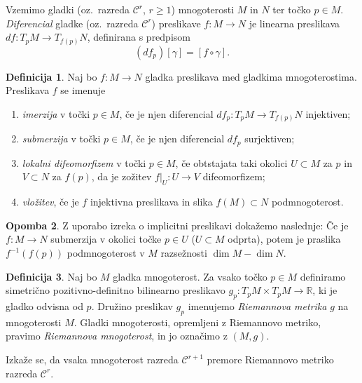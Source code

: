\documentclass[12pt,a4paper,twoside]{article}
\theoremstyle{definition} %
\newtheorem{definicija}{Definicija}[section]
\newtheorem{opomba}[definicija]{Opomba}
\theoremstyle{plain} %
\numberwithin{equation}{section}  %
\newcommand{\R}{\mathbb R}
\begin{document}
Vzemimo gladki (oz.~razreda $\mathcal{C}^{r}$, $r \geq 1$) mnogoterosti $M$ in $N$ ter točko $p \in M$. \emph{Diferencial} gladke (oz.~razreda $\mathcal{C}^{r}$) preslikave $f \colon M \to N$ je linearna preslikava $df \colon T_{p}M \to T_{f(p)}N$, definirana s predpisom
\begin{equation}
(df_{p})[\gamma] = [f \circ \gamma].
\end{equation}

\begin{definicija}
Naj bo $f \colon M \to N$ gladka preslikava med gladkima mnogoterostima. Preslikava $f$ se imenuje 
\begin{enumerate}
\item \emph{imerzija} v točki $p \in M$, če je njen diferencial $df_{p} \colon T_{p}M \to T_{f(p)}N$ injektiven;
\item \emph{submerzija} v točki $p \in M$, če je njen diferencial $df_{p}$ surjektiven;
\item \emph{lokalni difeomorfizem} v točki $p \in M$, če obtstajata taki okolici $U \subset M$ za $p$ in $V \subset N$ za $f(p)$, da je zožitev $f|_{U} \colon U \to V$ difeomorfizem;
\item \emph{vložitev}, če je $f$ injektivna preslikava in slika $f(M) \subset N$ podmnogoterost.
\end{enumerate}
\end{definicija}

\begin{opomba}
Z uporabo izreka o implicitni preslikavi dokažemo naslednje: Če je $f \colon M \to N$ submerzija v okolici točke $p \in U$ ($U \subset M$ odprta), potem je praslika $f^{-1}(f(p))$ podmnogoterost v $M$ razsežnosti $\dim M - \dim N$.
\end{opomba}

\begin{definicija}
Naj bo $M$ gladka mnogoterost. Za vsako točko $p \in M$ definiramo simetrično pozitivno-definitno bilinearno preslikavo $g_{p} \colon T_{p}M \times T_{p}M \to \R$, ki je gladko odvisna od $p$. Družino preslikav $g_{p}$ imenujemo \emph{Riemannova metrika} $g$ na mnogoterosti $M$.
Gladki mnogoterosti, opremljeni z Riemannovo metriko, pravimo \emph{Riemannova mnogoterost}, in jo označimo z $(M,g)$.
\end{definicija}

Izkaže se, da vsaka mnogoterost razreda $\mathcal{C}^{r+1}$ premore Riemannovo metriko razreda $\mathcal{C}^{r}$.
\end{document}
